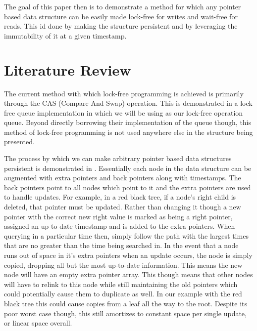 \documentclass[11pt]{article}       %
\begin{document}
The goal of this paper then is to demonstrate a method for which any pointer based data structure
can be easily made lock-free for writes and wait-free for reads. This id done by making the structure 
persistent and by leveraging the immutability of it at a given timestamp.


\section{Literature Review} \label{litrev}

The current method with which lock-free programming is achieved is primarily through the CAS (Compare
And Swap) operation. This is demonstrated in a lock free queue implementation in \cite{ABC07} which 
we will be using as our lock-free operation queue. Beyond directly borrowing their implementation of the
queue though, this method of lock-free programming is not used anywhere else in the structure being
presented.

The process by which we can make arbitrary pointer based data structures persistent is demonstrated
in \cite{DSST89}. Essentially each node in the data structure can be augmented with extra pointers and
back pointers along with timestamps. The back pointers point to all nodes which point to it and the extra
pointers are used to handle updates. For example, in a red black tree, if a node's right child is deleted,
that pointer must be updated. Rather than changing it though a new pointer with the correct new right value
is marked as being a right pointer, assigned an up-to-date timestamp and is added to the extra pointers.
When querying in a particular time then, simply follow the path with the largest times that are no greater
than the time being searched in. In the event that a node runs out of space in it's extra pointers when an
update occurs, the node is simply copied, dropping all but the most up-to-date information. This means the
new node will have an empty extra pointer array. This though means that other nodes will have to relink to
this node while still maintaining the old pointers which could potentially cause them to duplicate as well.
In our example with the red black tree this could cause copies from a leaf all the way to the root. Despite
its poor worst case though, this still amortizes to constant space per single update, or linear space overall.




\end{document}
